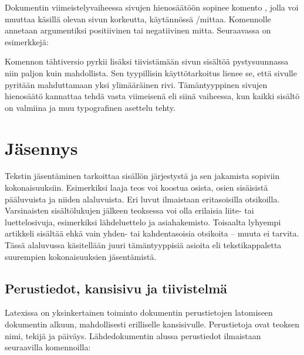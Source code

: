 Dokumentin viimeistelyvaiheessa sivujen hienosäätöön sopinee komento
, jolla voi muuttaa käsillä olevan sivun
korkeutta, käytännössä \-/mittaa. Komennolle annetaan
argumentiksi positiivinen tai negatiivinen mitta. Seuraavassa on
esimerkkejä:

\begin{koodilohkosis}
\enlargethispage{12bp}          %
\enlargethispage{-4bp}          %
\enlargethispage{\baselineskip} %
\end{koodilohkosis}

Komennon tähtiversio  pyrkii lisäksi
tiivistämään sivun sisältöä pystysuunnassa niin paljon kuin mahdollista.
Sen tyypillisin käyttötarkoitus lienee se, että sivulle pyritään
mahduttamaan yksi ylimääräinen rivi. Tämäntyyppinen sivujen hienosäätö
kannattaa tehdä vasta viimeisenä eli siinä vaiheessa, kun kaikki sisältö
on valmiina ja muu typografinen asettelu tehty.

\section{Jäsennys}
\label{luku:jäsennys}

Tekstin jäsentäminen tarkoittaa sisällön järjestystä ja sen jakamista
sopiviin kokonaisuuksiin. Esimerkiksi laaja teos voi koostua osista,
osien sisäisistä pääluvuista ja niiden alaluvuista. Eri luvut ilmaistaan
eritasoisilla otsikoilla. Varsinaisten sisältölukujen jälkeen teoksessa
voi olla erilaisia liite- tai luettelosivuja, esimerkiksi lähdeluettelo
ja asiahakemisto. Toisaalta lyhyempi artikkeli sisältää ehkä vain yhden-
tai kahdentasoisia otsikoita -- muuta ei tarvita. Tässä alaluvussa
käsitellään juuri tämäntyyppisiä asioita eli tekstikappaletta suurempien
kokonaisuuksien jäsentämistä.

\subsection{Perustiedot, kansisivu ja tiivistelmä}
\label{luku:dokumentin_perustiedot}

Latexissa on yksinkertainen toiminto dokumentin perustietojen latomiseen
dokumentin alkuun, mahdollisesti erilliselle kansisivulle. Perustietoja
ovat teoksen nimi, tekijä ja päiväys. Lähdedokumentin alussa perustiedot
ilmaistaan seuraavilla komennoilla:

